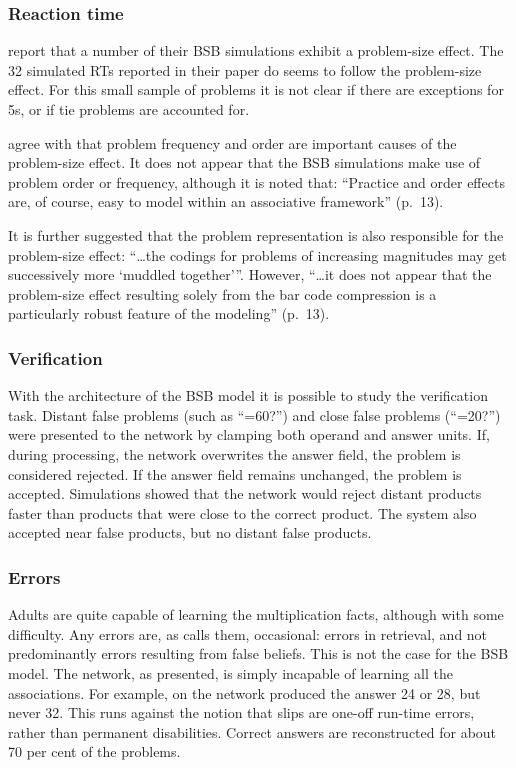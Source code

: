 \subsubsection{Reaction time}

 report that a number of their BSB simulations exhibit a
problem-size effect. The 32 simulated RTs reported in their paper do seems to
follow the problem-size effect. For this small sample of problems it
is not clear if there are exceptions for 5s, or if tie problems are
accounted for.

\citeauthor{andestud} agree with \citeauthor{camp85} that problem frequency
and order are important causes of the problem-size effect. It does not
appear that the BSB simulations make use of problem order or frequency,
although it is noted that: ``Practice and order effects are, of course,
easy to model within an associative framework'' (p.~13).

It is further suggested that the problem representation is also responsible
for the problem-size effect:
``\ldots the codings for problems of increasing magnitudes
may get successively more `muddled together'{''}.  However, ``\ldots it
does not appear that the problem-size effect resulting solely from the bar
code compression is a particularly robust feature of the modeling''
(p.~13).

\subsubsection{Verification}

With the architecture of the BSB model it is possible to study the
verification task. Distant false problems (such as ``=60?'') and close
false problems (``=20?'') were presented to the network by clamping
both operand and answer units. If, during processing, the network
overwrites the answer field, the problem is considered rejected.  If the
answer field remains unchanged, the problem is accepted. Simulations showed
that the network would reject distant products
faster than products that were close to the
correct product.  The system also accepted near false products, but no
distant false products.

\subsubsection{Errors}

Adults are quite capable of learning the multiplication facts, although
with some difficulty.  Any errors are, as  calls them,
occasional: errors in retrieval, and not predominantly errors resulting
from false beliefs. This is not the case for the BSB model.  The network,
as presented, is simply incapable of learning all the associations. For
example, on  the network produced the answer 24 or 28, but never 32.
This runs against the notion that
slips are one-off run-time errors, rather than permanent disabilities.
Correct answers
are reconstructed for about 70 per cent of the problems.

